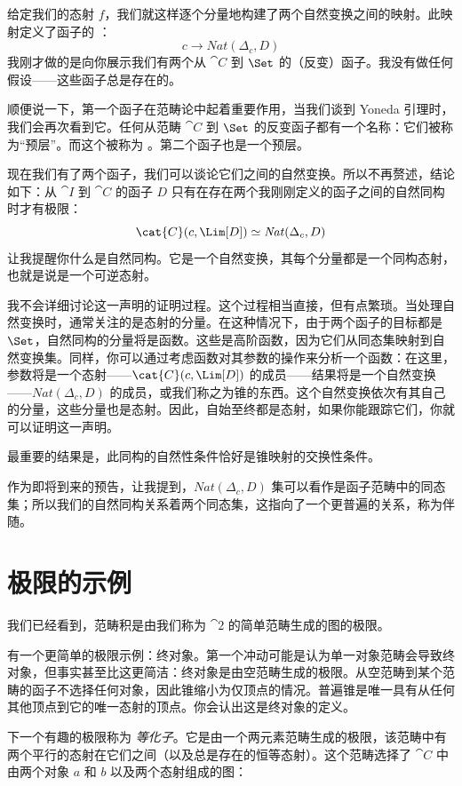 \noindent
给定我们的态射 $f$，我们就这样逐个分量地构建了两个自然变换之间的映射。此映射定义了函子的 ：
\[c \to \mathit{Nat}(\Delta_c, D)\]
我刚才做的是向你展示我们有两个从 $\cat{C}$ 到 $\Set$ 的（反变）函子。我没有做任何假设——这些函子总是存在的。

顺便说一下，第一个函子在范畴论中起着重要作用，当我们谈到 Yoneda 引理时，我们会再次看到它。任何从范畴 $\cat{C}$ 到 $\Set$ 的反变函子都有一个名称：它们被称为“预层”。而这个被称为 。第二个函子也是一个预层。

现在我们有了两个函子，我们可以谈论它们之间的自然变换。所以不再赘述，结论如下：从 $\cat{I}$ 到 $\cat{C}$ 的函子 $D$ 只有在存在两个我刚刚定义的函子之间的自然同构时才有极限：
\[\cat{C}(c, \Lim[D]) \simeq \mathit{Nat}(\Delta_c, D)\]
让我提醒你什么是自然同构。它是一个自然变换，其每个分量都是一个同构态射，也就是说是一个可逆态射。

我不会详细讨论这一声明的证明过程。这个过程相当直接，但有点繁琐。当处理自然变换时，通常关注的是态射的分量。在这种情况下，由于两个函子的目标都是 $\Set$，自然同构的分量将是函数。这些是高阶函数，因为它们从同态集映射到自然变换集。同样，你可以通过考虑函数对其参数的操作来分析一个函数：在这里，参数将是一个态射——$\cat{C}(c, \Lim[D])$ 的成员——结果将是一个自然变换——$\mathit{Nat}(\Delta_c, D)$ 的成员，或我们称之为锥的东西。这个自然变换依次有其自己的分量，这些分量也是态射。因此，自始至终都是态射，如果你能跟踪它们，你就可以证明这一声明。

最重要的结果是，此同构的自然性条件恰好是锥映射的交换性条件。

作为即将到来的预告，让我提到，$\mathit{Nat}(\Delta_c, D)$ 集可以看作是函子范畴中的同态集；所以我们的自然同构关系着两个同态集，这指向了一个更普遍的关系，称为伴随。

\section{极限的示例}

我们已经看到，范畴积是由我们称为 $\cat{2}$ 的简单范畴生成的图的极限。

有一个更简单的极限示例：终对象。第一个冲动可能是认为单一对象范畴会导致终对象，但事实甚至比这更简洁：终对象是由空范畴生成的极限。从空范畴到某个范畴的函子不选择任何对象，因此锥缩小为仅顶点的情况。普遍锥是唯一具有从任何其他顶点到它的唯一态射的顶点。你会认出这是终对象的定义。

下一个有趣的极限称为 \emph{等化子}。它是由一个两元素范畴生成的极限，该范畴中有两个平行的态射在它们之间（以及总是存在的恒等态射）。这个范畴选择了 $\cat{C}$ 中由两个对象 $a$ 和 $b$ 以及两个态射组成的图：


